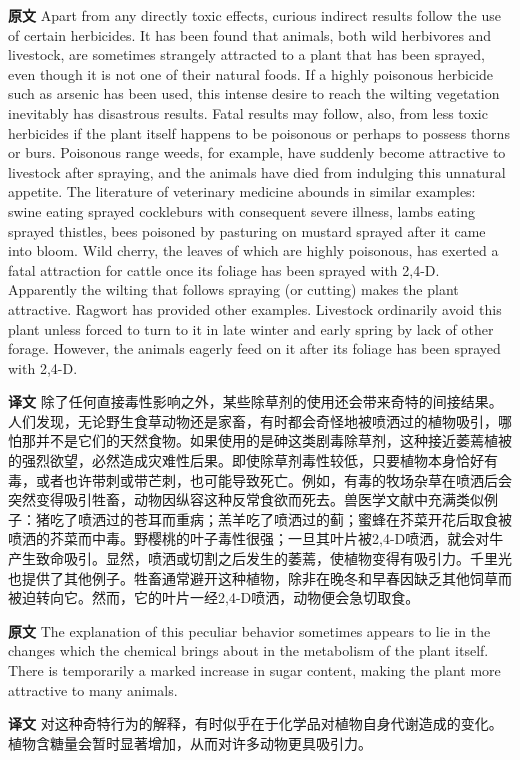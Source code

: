 \documentclass[UTF8,zihao=-4]{ctexart}
\begin{document}
\noindent\textbf{原文} Apart from any directly toxic effects, curious indirect results follow the use of certain herbicides. It has been found that animals, both wild herbivores and livestock, are sometimes strangely attracted to a plant that has been sprayed, even though it is not one of their natural foods. If a highly poisonous herbicide such as arsenic has been used, this intense desire to reach the wilting vegetation inevitably has disastrous results. Fatal results may follow, also, from less toxic herbicides if the plant itself happens to be poisonous or perhaps to possess thorns or burs. Poisonous range weeds, for example, have suddenly become attractive to livestock after spraying, and the animals have died from indulging this unnatural appetite. The literature of veterinary medicine abounds in similar examples: swine eating sprayed cockleburs with consequent severe illness, lambs eating sprayed thistles, bees poisoned by pasturing on mustard sprayed after it came into bloom. Wild cherry, the leaves of which are highly poisonous, has exerted a fatal attraction for cattle once its foliage has been sprayed with 2,4-D. Apparently the wilting that follows spraying (or cutting) makes the plant attractive. Ragwort has provided other examples. Livestock ordinarily avoid this plant unless forced to turn to it in late winter and early spring by lack of other forage. However, the animals eagerly feed on it after its foliage has been sprayed with 2,4-D.
\par
\noindent\textbf{译文} 除了任何直接毒性影响之外，某些除草剂的使用还会带来奇特的间接结果。人们发现，无论野生食草动物还是家畜，有时都会奇怪地被喷洒过的植物吸引，哪怕那并不是它们的天然食物。如果使用的是砷这类剧毒除草剂，这种接近萎蔫植被的强烈欲望，必然造成灾难性后果。即使除草剂毒性较低，只要植物本身恰好有毒，或者也许带刺或带芒刺，也可能导致死亡。例如，有毒的牧场杂草在喷洒后会突然变得吸引牲畜，动物因纵容这种反常食欲而死去。兽医学文献中充满类似例子：猪吃了喷洒过的苍耳而重病；羔羊吃了喷洒过的蓟；蜜蜂在芥菜开花后取食被喷洒的芥菜而中毒。野樱桃的叶子毒性很强；一旦其叶片被2,4-D喷洒，就会对牛产生致命吸引。显然，喷洒或切割之后发生的萎蔫，使植物变得有吸引力。千里光也提供了其他例子。牲畜通常避开这种植物，除非在晚冬和早春因缺乏其他饲草而被迫转向它。然而，它的叶片一经2,4-D喷洒，动物便会急切取食。
\par\medskip

\noindent\textbf{原文} The explanation of this peculiar behavior sometimes appears to lie in the changes which the chemical brings about in the metabolism of the plant itself. There is temporarily a marked increase in sugar content, making the plant more attractive to many animals.
\par
\noindent\textbf{译文} 对这种奇特行为的解释，有时似乎在于化学品对植物自身代谢造成的变化。植物含糖量会暂时显著增加，从而对许多动物更具吸引力。
\par\medskip
\end{document}
